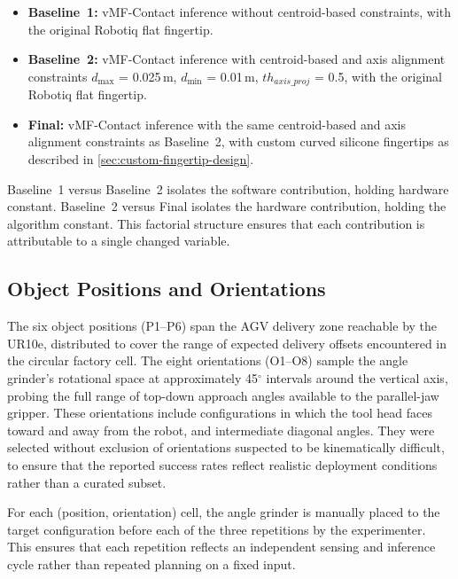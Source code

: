 \documentclass[oneside,studentpaper]{wbk}
\begin{document}
\begin{itemize}
  \item \textbf{Baseline~1:} vMF-Contact inference without centroid-based constraints, with the original Robotiq flat fingertip.
  \item \textbf{Baseline~2:} vMF-Contact inference with centroid-based and axis alignment constraints $d_{\max}$ = 0.025\,m, $d_{\min}$ = 0.01\,m, $th_{axis\_proj}$ = 0.5, with the original Robotiq flat fingertip.
  \item \textbf{Final:} vMF-Contact inference with the same centroid-based and axis alignment constraints as Baseline~2, with custom curved silicone fingertips as described in \cref{sec:custom-fingertip-design}.
\end{itemize}

Baseline~1 versus Baseline~2 isolates the software contribution, holding hardware constant. Baseline~2 versus Final isolates the hardware contribution, holding the algorithm constant. This factorial structure ensures that each contribution is attributable to a single changed variable.


\subsection{Object Positions and Orientations}

The six object positions (P1--P6) span the AGV delivery zone reachable by the UR10e, distributed to cover the range of expected delivery offsets encountered in the circular factory cell. The eight orientations (O1--O8) sample the angle grinder's rotational space at approximately 45$^\circ$ intervals around the vertical axis, probing the full range of top-down approach angles available to the parallel-jaw gripper. These orientations include configurations in which the tool head faces toward and away from the robot, and intermediate diagonal angles. They were selected without exclusion of orientations suspected to be kinematically difficult, to ensure that the reported success rates reflect realistic deployment conditions rather than a curated subset.

For each (position, orientation) cell, the angle grinder is manually placed to the target configuration before each of the three repetitions by the experimenter. This ensures that each repetition reflects an independent sensing and inference cycle rather than repeated planning on a fixed input.
\end{document}

